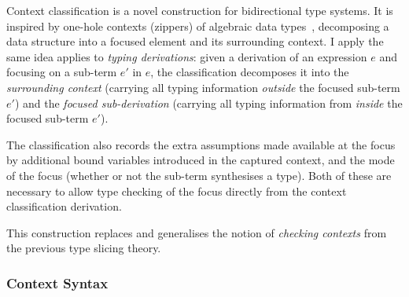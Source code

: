 Context classification is a novel construction for bidirectional type systems. It is inspired by one-hole contexts (zippers) of algebraic data types~\cite{Huet1997}, decomposing a data structure into a focused element and its surrounding context. I apply the same idea applies to \textit{typing derivations}: given a derivation of an expression $e$ and focusing on a sub-term $e'$ in $e$, the classification decomposes it into the \textit{surrounding context} (carrying all typing information \textit{outside} the focused sub-term $e'$) and the \textit{focused sub-derivation} (carrying all typing information from \textit{inside} the focused sub-term $e'$). 

The classification also records the extra assumptions made available at the focus by additional bound variables introduced in the captured context, and the mode of the focus (whether or not the sub-term synthesises a type). Both of these are necessary to allow type checking of the focus directly from the context classification derivation.

\begin{remark}
    This construction replaces and generalises the notion of \textit{checking contexts} from the previous type slicing theory.
\end{remark}

\subsubsection{\yo Context Syntax}
\label{sec:context-syntax}

